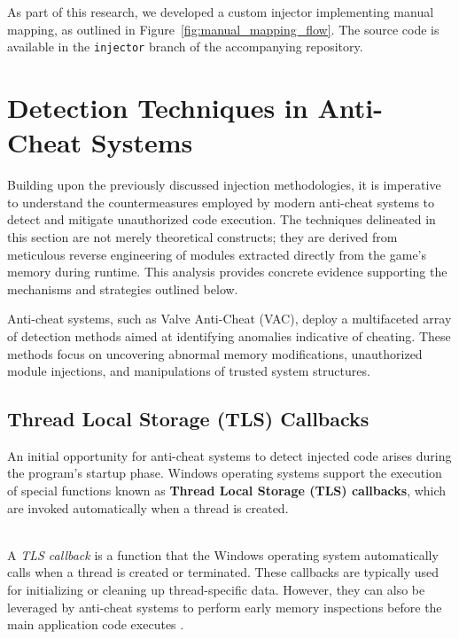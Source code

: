 As part of this research, we developed a custom injector implementing manual mapping, as outlined in Figure~\ref{fig:manual_mapping_flow}. The source code is available in the \texttt{injector} branch of the accompanying repository.


\section{Detection Techniques in Anti-Cheat Systems}

Building upon the previously discussed injection methodologies, it is imperative to understand the countermeasures employed by modern anti-cheat systems to detect and mitigate unauthorized code execution. The techniques delineated in this section are not merely theoretical constructs; they are derived from meticulous reverse engineering of modules extracted directly from the game's memory during runtime. This analysis provides concrete evidence supporting the mechanisms and strategies outlined below.

Anti-cheat systems, such as Valve Anti-Cheat (VAC), deploy a multifaceted array of detection methods aimed at identifying anomalies indicative of cheating. These methods focus on uncovering abnormal memory modifications, unauthorized module injections, and manipulations of trusted system structures.

\subsection*{Thread Local Storage (TLS) Callbacks}

An initial opportunity for anti-cheat systems to detect injected code arises during the program's startup phase. Windows operating systems support the execution of special functions known as \textbf{Thread Local Storage (TLS) callbacks}, which are invoked automatically when a thread is created.

\begin{tcolorbox}[colback=gray!10, colframe=gray!50, boxrule=0pt, sharp corners, width=\linewidth, left=1mm, right=1mm, top=0.5mm, bottom=0.5mm]
 \\
A \textit{TLS callback} is a function that the Windows operating system automatically calls when a thread is created or terminated. These callbacks are typically used for initializing or cleaning up thread-specific data. However, they can also be leveraged by anti-cheat systems to perform early memory inspections before the main application code executes \parencite{mitre2025tls}.
\end{tcolorbox}

